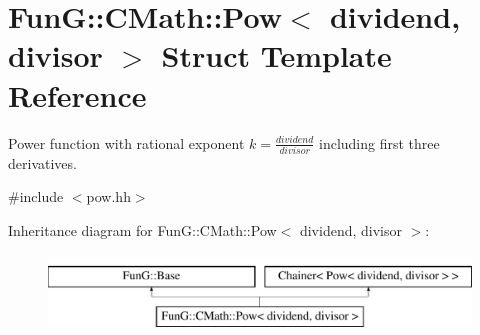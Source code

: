 \hypertarget{structFunG_1_1CMath_1_1Pow}{\section{Fun\-G\-:\-:C\-Math\-:\-:Pow$<$ dividend, divisor $>$ Struct Template Reference}
\label{structFunG_1_1CMath_1_1Pow}
}


Power function with rational exponent $ k = \frac{dividend}{divisor} $ including first three derivatives.  




{\ttfamily \#include $<$pow.\-hh$>$}

Inheritance diagram for Fun\-G\-:\-:C\-Math\-:\-:Pow$<$ dividend, divisor $>$\-:\begin{figure}[H]
\begin{center}
\leavevmode
\includegraphics[height=2.000000cm]{structFunG_1_1CMath_1_1Pow}
\end{center}
\end{figure}
